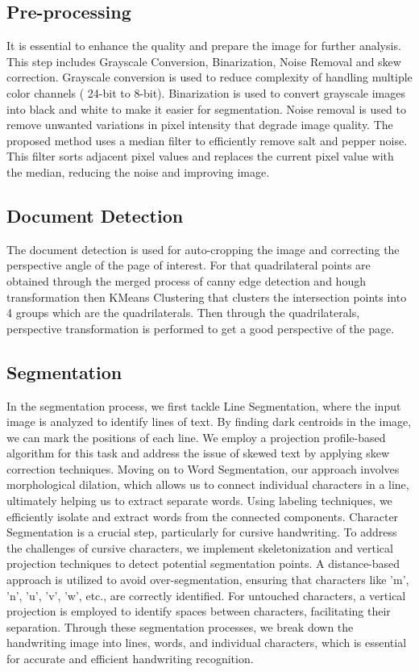 \subsection{Pre-processing}
It is essential to enhance the quality and prepare the image for further analysis. This step includes Grayscale Conversion, Binarization, Noise Removal and skew correction. Grayscale conversion is used to reduce complexity of handling multiple color channels ( 24-bit to 8-bit). Binarization is used to convert grayscale images into black and white to make it easier for segmentation.\newline
Noise removal is used to remove unwanted variations in pixel intensity that degrade image quality. The proposed method uses a median filter to efficiently remove salt and pepper noise. This filter sorts adjacent pixel values and replaces the current pixel value with the median, reducing the noise and improving image.
\subsection{Document Detection}
The document detection is used for auto-cropping the image and correcting the perspective angle of the page of interest. For that quadrilateral points are obtained through the merged process of canny edge detection and hough transformation then KMeans Clustering that clusters the intersection points into 4 groups which are the quadrilaterals. Then through the quadrilaterals, perspective transformation is performed to get a good perspective of the page\cite{Ishfar2020DocumentDetection}.
\subsection{Segmentation}
In the segmentation process, we first tackle Line Segmentation, where the input image is       analyzed to identify lines of text. By finding dark centroids in the image, we can mark the positions of each line. We employ a projection profile-based algorithm for this task and address the issue of skewed text by applying skew correction techniques.\newline 
Moving on to Word Segmentation, our approach involves morphological dilation, which allows us to connect individual characters in a line, ultimately helping us to extract separate words. Using labeling techniques, we efficiently isolate and extract words from the connected components.\newline 
Character Segmentation is a crucial step, particularly for cursive handwriting. To address the challenges of cursive characters, we implement skeletonization and vertical projection techniques to detect potential segmentation points. A distance-based approach is utilized to avoid over-segmentation, ensuring that characters like 'm', 'n', 'u', 'v', 'w', etc., are correctly identified. For untouched characters, a vertical projection is employed to identify spaces between characters, facilitating their separation.\newline
Through these segmentation processes, we break down the handwriting image into lines, words, and individual characters, which is essential for accurate and efficient handwriting recognition.
